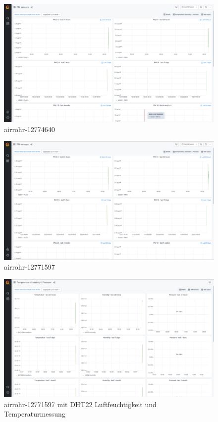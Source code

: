 \documentclass[draft=false
              ,paper=a4
              ,twoside=false
              ,fontsize=10pt
              ,headsepline
              ,BCOR10mm
              ,DIV11
              ]{article}
\begin{document}
\begin{figure}[H]
  \includegraphics[width=\textwidth]{airrohr-12774640}
  \caption{airrohr-12774640}
\end{figure}

\begin{figure}[H]
  \includegraphics[width=\textwidth]{airrohr-12771597}
  \caption{airrohr-12771597}
\end{figure}

\begin{figure}[H]
\includegraphics[width=\textwidth]{airrohr-12771597DHT22Messung}
\caption{airrohr-12771597 mit DHT22 Luftfeuchtigkeit und Temperaturmessung}
\end{figure}
\end{document}
